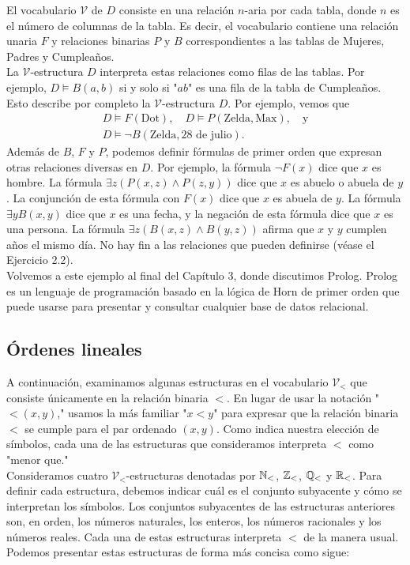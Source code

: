 \documentclass[12pt,a4paper]{book}
\newcommand{\comillas}[1]{"#1"}
\newcommand{\VV}{\mathcal{V}}
\begin{document}
    El vocabulario $\VV$ de $D$ consiste en una relación $n$-aria por cada tabla, donde $n$ es el número de columnas de la
    tabla. Es decir, el vocabulario contiene una relación unaria $F$ y relaciones binarias $P$ y $B$ correspondientes a las
    tablas de Mujeres, Padres y Cumpleaños.\\
    La $\VV$-estructura $D$ interpreta estas relaciones como filas de las tablas. Por ejemplo, $D\models B(a,b)$ si y solo
    si \comillas{$ab$} es una fila de la tabla de Cumpleaños. Esto describe por completo la $\VV$-estructura $D$. Por
    ejemplo, vemos que
    \begin{gather*}
        D\models F(\text{Dot}),\quad D\models P(\text{Zelda},\text{Max}),\quad\text{y}\\
        D\models\neg B(\text{Zelda},\text{28 de julio}).
    \end{gather*}
    Además de $B$, $F$ y $P$, podemos definir fórmulas de primer orden que expresan otras relaciones diversas en $D$. Por
    ejemplo, la fórmula $\neg F(x)$ dice que $x$ es hombre. La fórmula $\exists z(P(x,z)\wedge P(z,y))$ dice que $x$ es
    abuelo o abuela de $y$. La conjunción de esta fórmula con $F(x)$ dice que $x$ es abuela de $y$. La fórmula
    $\exists yB(x,y)$ dice que $x$ es una fecha, y la negación de esta fórmula dice que $x$ es una persona. La fórmula
    $\exists z(B(x,z)\wedge B(y,z))$ afirma que $x$ y $y$ cumplen años el mismo día. No hay fin a las relaciones que pueden
    definirse (véase el Ejercicio 2.2).\\
    Volvemos a este ejemplo al final del Capítulo 3, donde discutimos Prolog. Prolog es un lenguaje de programación basado
    en la lógica de Horn de primer orden que puede usarse para presentar y consultar cualquier base de datos relacional.

    \subsection{Órdenes lineales}

    A continuación, examinamos algunas estructuras en el vocabulario $\VV_{<}$ que consiste únicamente en la relación
    binaria $<$. En lugar de usar la notación \comillas{$<(x,y)$,} usamos la más familiar \comillas{$x<y$} para expresar
    que la relación binaria $<$ se cumple para el par ordenado $(x,y)$. Como indica nuestra elección de símbolos, cada una
    de las estructuras que consideramos interpreta $<$ como \comillas{menor que.}\\
    Consideramos cuatro $\VV_{<}$-estructuras denotadas por $\mathbb{N}_{<}$, $\mathbb{Z}_{<}$, $\mathbb{Q}_{<}$ y $\mathbb{R}_{<}$. Para definir cada
    estructura, debemos indicar cuál es el conjunto subyacente y cómo se interpretan los símbolos. Los conjuntos
    subyacentes de las estructuras anteriores son, en orden, los números naturales, los enteros, los números racionales y
    los números reales. Cada una de estas estructuras interpreta $<$ de la manera usual. Podemos presentar estas
    estructuras de forma más concisa como sigue:
\end{document}
